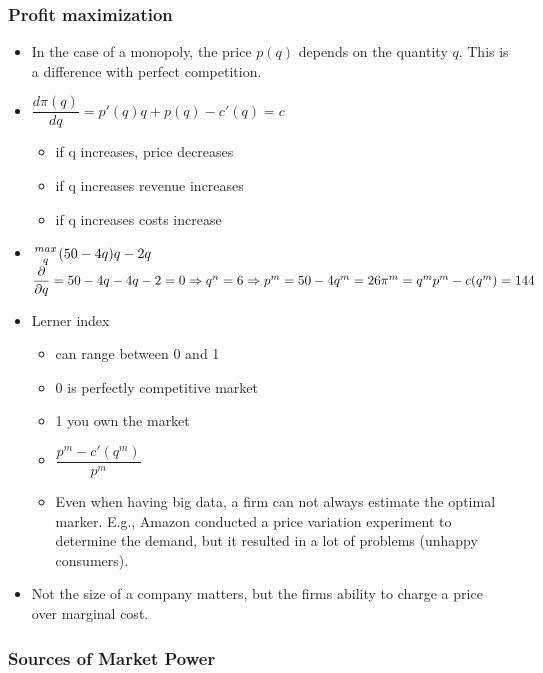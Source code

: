 \documentclass[12pt, a4paper, titlepage]{extarticle}
\newcommand*{\bfrac}[2]{\genfrac{}{}{0pt}{}{#1}{#2}}
\begin{document}
	\subsubsection{Profit maximization}
	\begin{itemize}
	\item In the case of a monopoly, the price $p(q)$ depends on the quantity $q$. This is a difference with perfect competition.
    \item $\dfrac{d \pi (q)}{dq}= p'(q)q + p(q) - c'(q) = c$
    
    \begin{itemize}
    \item if q increases, price decreases
    \item if q increases revenue increases
    \item if q increases costs increase
    \end{itemize}
    \item $\bfrac{max}{q}(50-4q)q-2q$ \\ $\dfrac{\partial}{\partial q} = 50 - 4q - 4q -2 = 0\\ \Rightarrow q^n = 6 \\ \Rightarrow p^m = 50 - 4q^m = 26 \\
    \pi^m = q^m p^m - c(q^m) = 144$
	\item Lerner index
	\begin{itemize}
	\item can range between 0 and 1
	\item 0 is perfectly competitive market
	\item 1 you own the market
	\item $\dfrac{p^m - c'(q^m)}{p^m}$
	\item Even when having big data, a firm can not always estimate the optimal marker. E.g., Amazon conducted a price variation experiment to determine the demand, but it resulted in a lot of problems (unhappy consumers).
	\end{itemize}
	\item Not the size of a company matters, but the firms ability to charge a price over marginal cost.
	\end{itemize}
	
	
	\subsubsection{Sources of Market Power}
	
\end{document}
